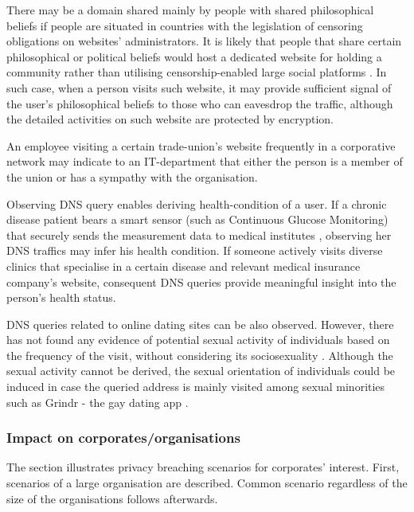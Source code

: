There may be a domain shared mainly by people with shared philosophical beliefs if people are situated in countries with the legislation of censoring obligations on websites' administrators.
It is likely that people that share certain philosophical or political beliefs would host a dedicated website for holding a community rather than utilising censorship-enabled large social platforms \cite{mackinnon2009china}.
In such case, when a person visits such website, it may provide sufficient signal of the user's philosophical beliefs to those who can eavesdrop the traffic, although the detailed activities on such website are protected by encryption.

An employee visiting a certain trade-union's website frequently in a corporative network may indicate to an IT-department that either the person is a member of the union or has a sympathy with the organisation. 

Observing DNS query enables deriving health-condition of a user. If a chronic disease patient bears a smart sensor (such as Continuous Glucose Monitoring) that securely sends the measurement data to medical institutes \cite{carelink-uploading, medtronic-watson}, observing her DNS traffics may infer his health condition.
If someone actively visits diverse clinics that specialise in a certain disease and relevant medical insurance company's website, consequent DNS queries provide meaningful insight into the person's health status.

DNS queries related to online dating sites can be also observed. However, there has not found any evidence of potential sexual activity of individuals based on the frequency of the visit, without considering its sociosexuality \cite{sevi2018exploring}. 
Although the sexual activity cannot be derived, the sexual orientation of individuals could be induced in case the queried address is mainly visited among sexual minorities such as Grindr - the gay dating app \cite{goedel2015geosocial}.

\subsubsection{Impact on corporates/organisations}
The section illustrates privacy breaching scenarios for corporates' interest. First, scenarios of a large organisation are described. Common scenario regardless of the size of the organisations follows afterwards.

